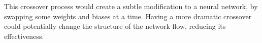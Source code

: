 \documentclass[12pt,a4paper]{article}
\makeatletter
\def\BState{\State\hskip-\ALG@thistlm}
\makeatother
\begin{document}
    This crossover process would create a subtle modification to a neural network, by swapping some weights and biases at a time. Having a more dramatic crossover could potentially change the structure of the network flow, reducing its effectiveness.



        

\end{document}
